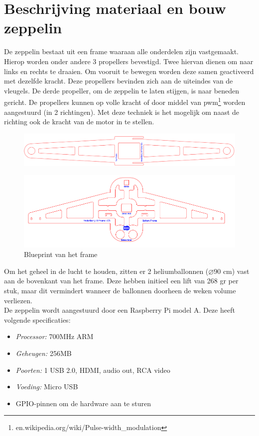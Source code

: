 \documentclass[eind]{penoverslag}
\begin{document}
\section{Beschrijving materiaal en bouw zeppelin}
De zeppelin bestaat uit een frame waaraan alle onderdelen zijn vastgemaakt. Hierop worden onder andere 3 propellers bevestigd. Twee hiervan dienen om naar links en rechts te draaien. Om vooruit te bewegen worden deze samen geactiveerd met dezelfde kracht. Deze propellers bevinden zich aan de uiteindes van de vleugels. De derde propeller, om de zeppelin te laten stijgen, is naar beneden gericht. De propellers kunnen op volle kracht of door middel van pwm\footnote{en.wikipedia.org/wiki/Pulse-width\_modulation} worden aangestuurd (in 2 richtingen). Met deze techniek is het mogelijk om naast de richting ook de kracht van de motor in te stellen.~\\

\begin{figure}[h!]
\centering
\includegraphics[scale=0.3]{upperFrame.png}
\label{frame}
\end{figure}

\begin{figure}[h!]
\centering
\includegraphics[scale=0.3]{lowerFrame.png}
\caption{Blueprint van het frame}
\label{frame}
\end{figure}

Om het geheel in de lucht te houden, zitten er 2 heliumballonnen ($\diameter$90 cm) vast aan de bovenkant van het frame. Deze hebben initieel een lift van 268 gr per stuk, maar dit vermindert wanneer de ballonnen doorheen de weken volume verliezen. \\

De zeppelin wordt aangestuurd door een Raspberry Pi model A. Deze heeft volgende specificaties:
\begin{itemize}
\item \emph{Processor:} 700MHz ARM
\item \emph{Geheugen:} 256MB
\item \emph{Poorten:} 1 USB 2.0, HDMI, audio out, RCA video
\item \emph{Voeding:} Micro USB
\item GPIO-pinnen om de hardware aan te sturen
\end{itemize}
\end{document}
